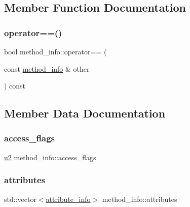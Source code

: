 \subsection{Member Function Documentation}
\mbox{\label{structmethod__info_ab54ed16ea03e7462cb0ec395bb3a88c3}} 
\subsubsection{\texorpdfstring{operator==()}{operator==()}}
{\footnotesize\ttfamily bool method\+\_\+info\+::operator== (\begin{DoxyParamCaption}\item[{const \hyperlink{structmethod__info}{method\+\_\+info} \&}]{other }\end{DoxyParamCaption}) const}



\subsection{Member Data Documentation}
\mbox{\label{structmethod__info_a3b657027a141cdbc94ded28607c98be5}} 
\subsubsection{\texorpdfstring{access\+\_\+flags}{access\_flags}}
{\footnotesize\ttfamily \hyperlink{types_8h_ae676e9207f57fb921dca7366b2f59c53}{u2} method\+\_\+info\+::access\+\_\+flags}

\mbox{\label{structmethod__info_a9bb84cae294f305b50714fd849f31f7e}} 
\subsubsection{\texorpdfstring{attributes}{attributes}}
{\footnotesize\ttfamily std\+::vector$<$\hyperlink{structattribute__info}{attribute\+\_\+info}$>$ method\+\_\+info\+::attributes}


